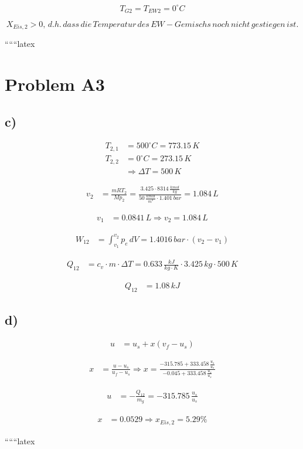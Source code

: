 \[
T_{G2} = T_{EW2} = 0^\circ C
\]

\[
X_{Eis,2} > 0, \, d.h. \, dass \, die \, Temperatur \, des \, EW-Gemischs \, noch \, nicht \, gestiegen \, ist.
\]

``````latex


\section*{Problem A3}

\subsection*{c)}

\begin{align*}
T_{2,1} &= 500^\circ C = 773.15\,K \\
T_{2,2} &= 0^\circ C = 273.15\,K \\
&\Rightarrow \Delta T = 500\,K
\end{align*}

\begin{align*}
v_2 &= \frac{mRT_2}{M p_2} = \frac{3.425 \cdot 8314 \, \frac{kmol}{kg}}{50 \, \frac{kmol}{m^3} \cdot 1.401 \, bar} = 1.084\,L
\end{align*}

\begin{align*}
v_1 &= 0.0841\,L \Rightarrow v_2 = 1.084\,L
\end{align*}

\begin{align*}
W_{12} &= \int_{v_1}^{v_2} p_e \, dV = 1.4016\,bar \cdot (v_2 - v_1)
\end{align*}

\begin{align*}
Q_{12} &= c_v \cdot m \cdot \Delta T = 0.633 \, \frac{kJ}{kg \cdot K} \cdot 3.425 \, kg \cdot 500\,K
\end{align*}

\begin{align*}
Q_{12} &= 1.08\,kJ
\end{align*}

\subsection*{d)}

\begin{align*}
u &= u_s + x(v_f - u_s)
\end{align*}

\begin{align*}
x &= \frac{u - u_s}{u_f - u_s} \Rightarrow x = \frac{-315.785 + 333.458 \, \frac{u_s}{u_s}}{-0.045 + 333.458 \, \frac{u_s}{u_s}}
\end{align*}

\begin{align*}
u &= -\frac{Q_{12}}{m_g} = -315.785 \, \frac{u_s}{u_s}
\end{align*}

\begin{align*}
x &= 0.0529 \Rightarrow x_{Eis,2} = 5.29\%
\end{align*}

``````latex


